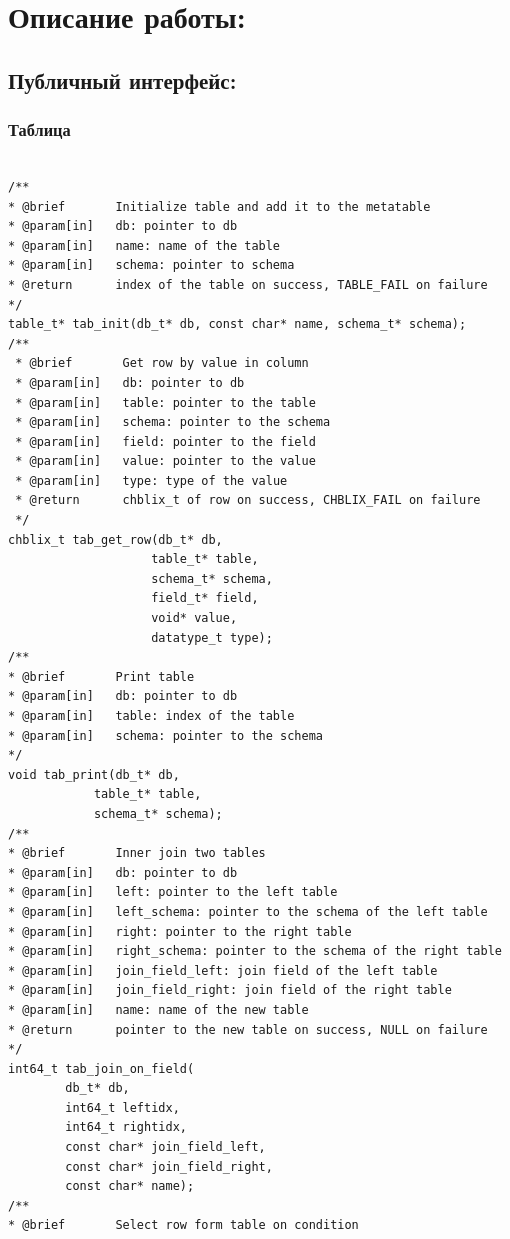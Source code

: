 \documentclass[12pt,onecolumn]{article}
\begin{document}
\section{Описание работы:}
\subsection{Публичный интерфейс:}
\subsubsection{Таблица}
\begin{lstlisting}[style=C]

/**
* @brief       Initialize table and add it to the metatable
* @param[in]   db: pointer to db
* @param[in]   name: name of the table
* @param[in]   schema: pointer to schema
* @return      index of the table on success, TABLE_FAIL on failure
*/
table_t* tab_init(db_t* db, const char* name, schema_t* schema);
/**
 * @brief       Get row by value in column
 * @param[in]   db: pointer to db
 * @param[in]   table: pointer to the table
 * @param[in]   schema: pointer to the schema
 * @param[in]   field: pointer to the field
 * @param[in]   value: pointer to the value
 * @param[in]   type: type of the value
 * @return      chblix_t of row on success, CHBLIX_FAIL on failure
 */
chblix_t tab_get_row(db_t* db,
                    table_t* table,
                    schema_t* schema, 
                    field_t* field, 
                    void* value, 
                    datatype_t type);
/**
* @brief       Print table
* @param[in]   db: pointer to db
* @param[in]   table: index of the table
* @param[in]   schema: pointer to the schema
*/
void tab_print(db_t* db, 
            table_t* table,
            schema_t* schema);
/**
* @brief       Inner join two tables
* @param[in]   db: pointer to db
* @param[in]   left: pointer to the left table
* @param[in]   left_schema: pointer to the schema of the left table
* @param[in]   right: pointer to the right table
* @param[in]   right_schema: pointer to the schema of the right table
* @param[in]   join_field_left: join field of the left table
* @param[in]   join_field_right: join field of the right table
* @param[in]   name: name of the new table
* @return      pointer to the new table on success, NULL on failure
*/                                  
int64_t tab_join_on_field(
        db_t* db,
        int64_t leftidx,
        int64_t rightidx,
        const char* join_field_left,
        const char* join_field_right,
        const char* name);
/**
* @brief       Select row form table on condition

\end{lstlisting}
\end{document}
